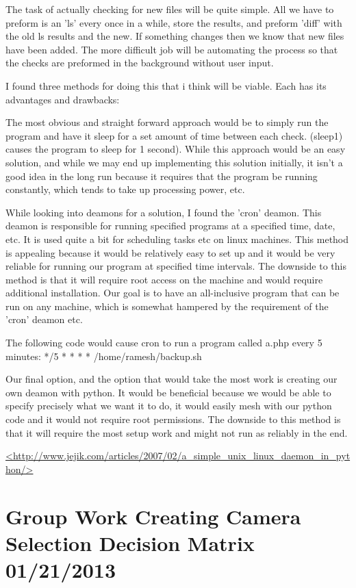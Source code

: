 \documentclass[]{article}
\begin{document}
	The task of actually checking for new files will be quite simple. All we have to preform is an 'ls' every once in a while, store the results, and preform 'diff' with the old ls results and the new. If something changes then we know that new files have been added.
	The more difficult job will be automating the process so that the checks are preformed in the background without user input.
	
	I found three methods for doing this that i think will be viable. Each has its advantages and drawbacks:
	
	The most obvious and straight forward approach would be to simply run the program and have it sleep for a set amount of time between each check. (sleep1) causes the program to sleep for 1 second). While this approach would be an easy solution, and while we may end up implementing this solution initially, it isn't a good idea in the long run because it requires that the program be running constantly, which tends to take up processing power, etc.
	
	
	While looking into deamons for a solution, I found the 'cron' deamon. This deamon is responsible for running specified programs at a specified time, date, etc. It is used quite a bit for scheduling tasks etc on linux machines. This method is appealing because it would be relatively easy to set up and it would be very reliable for running our program at specified time intervals. The downside to this method is that it will require root access on the machine and would require additional installation. Our goal is to have an all-inclusive program that can be run on any machine, which is somewhat hampered by the requirement of the 'cron' deamon etc.
	
	The following code would cause cron to run a program called a.php every 5 minutes: */5 * * * * /home/ramesh/backup.sh
	
	Our final option, and the option that would take the most work is creating our own deamon with python. It would be beneficial because we would be able to specify precisely what we want it to do, it would easily mesh with our python code and it would not require root permissions. The downside to this method is that it will require the most setup work and might not run as reliably in the end.
	
	\url{<http://www.jejik.com/articles/2007/02/a_simple_unix_linux_daemon_in_python/>}
	
	\section{Group Work Creating Camera Selection Decision Matrix 01/21/2013}
	
\end{document}
